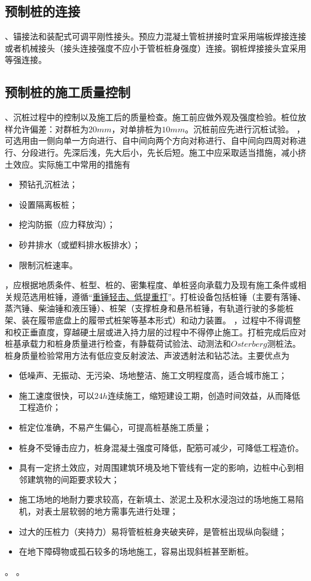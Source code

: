 \documentclass{book}
\begin{document}
\subsection{预制桩的连接}
、锚接法和装配式可调平刚性接头。预应力混凝土管桩拼接时宜采用端板焊接连接或者机械接头（接头连接强度不应小于管桩桩身强度）连接。钢桩焊接接头宜采用等强连接。
\subsection{预制桩的施工质量控制}
、沉桩过程中的控制以及施工后的质量检查。施工前应做外观及强度检验。桩位放样允许偏差：对群桩为$20mm$，对单排桩为$10mm$。沉桩前应先进行沉桩试验。
，可选用由一侧向单一方向进行、自中间向两个方向对称进行、自中间向四周对称进行、分段进行。先深后浅，先大后小，先长后短。施工中应采取适当措施，减小挤土效应。实际施工中常用的措施有
\begin{itemize}
    \item 预钻孔沉桩法；
    \item 设置隔离板桩；
    \item 挖沟防振（应力释放沟）；
    \item 砂井排水（或塑料排水板排水）；
    \item 限制沉桩速率。
\end{itemize}
，应根据地质条件、桩型、桩的、密集程度、单桩竖向承载力及现有施工条件或相关规范选用桩锤，遵循“\underline{重锤轻击、低提重打}”。打桩设备包括桩锤（主要有落锤、蒸汽锤、柴油锤和液压锤）、桩架（支撑桩身和悬吊桩锤，有轨道行驶的多能桩架、装在履带底盘上的履带式桩架等基本形式）和动力装置。
，过程中不得调整和校正垂直度，穿越硬土层或进入持力层的过程中不得停止施工。打桩完成后应对桩基承载力和桩身质量进行检查，有静载荷试验法、动测法和$Osterberg$测桩法。桩身质量检验常用方法有低应变反射波法、声波透射法和钻芯法。主要优点为\begin{itemize}
    \item 低噪声、无振动、无污染、场地整洁、施工文明程度高，适合城市施工；
    \item 施工速度很快，可以$24h$连续施工，缩短建设工期，创造时间效益，从而降低工程造价；
    \item 桩定位准确，不易产生偏心，可提高桩基施工质量；
    \item 桩身不受锤击应力，桩身混凝土强度可降低，配筋可减少，可降低工程造价。
\end{itemize}
\begin{itemize}
    \item 具有一定挤土效应，对周围建筑环境及地下管线有一定的影响，边桩中心到相邻建筑物的间距要求较大；
    \item 施工场地的地耐力要求较高，在新填土、淤泥土及积水浸泡过的场地施工易陷机，对表土层软弱的地方需事先进行处理；
    \item 过大的压桩力（夹持力）易将管桩桩身夹破夹碎，是管桩出现纵向裂缝；
    \item 在地下障碍物或孤石较多的场地施工，容易出现斜桩甚至断桩。
\end{itemize}
。
。
\end{document}

